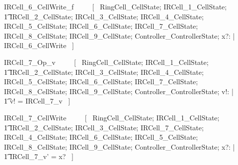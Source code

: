 \documentclass{article}
\begin{document}
\begin{zed}
IRCell\_6\_CellWrite\_f ~~~~ [~ 
    \Xi RingCell\_CellState; 
    \Xi IRCell\_1\_CellState; \\
    \t1 \Xi IRCell\_2\_CellState; 
    \Xi IRCell\_3\_CellState;
    \Xi IRCell\_4\_CellState; 
    \Xi IRCell\_5\_CellState; 
    \Xi IRCell\_6\_CellState; 
    \Xi IRCell\_7\_CellState; 
    \Xi IRCell\_8\_CellState; 
    \Xi IRCell\_9\_CellState; 
    \Xi Controller\_ControllerState; 
    x?: \nat | \\
    \lnot \pre IRCell\_6\_CellWrite ~] \\
\end{zed}
\begin{zed}
IRCell\_7\_Op\_v ~~~~ [~ 
    \Xi RingCell\_CellState; 
    \Xi IRCell\_1\_CellState; \\
    \t1 \Xi IRCell\_2\_CellState; 
    \Xi IRCell\_3\_CellState;
    \Xi IRCell\_4\_CellState; 
    \Xi IRCell\_5\_CellState; 
    \Xi IRCell\_6\_CellState; 
    \Xi IRCell\_7\_CellState; 
    \Xi IRCell\_8\_CellState; 
    \Xi IRCell\_9\_CellState; 
    \Xi Controller\_ControllerState; v!: \nat | \\
    \t1 v! = IRCell\_7\_v ~] \\
\end{zed}

\begin{zed}
IRCell\_7\_CellWrite ~~~~ [~ 
    \Xi RingCell\_CellState; 
    \Xi IRCell\_1\_CellState; \\
    \t1 \Xi IRCell\_2\_CellState; 
    \Xi IRCell\_3\_CellState; 
    \Delta IRCell\_7\_CellState;
    \Xi IRCell\_4\_CellState; 
    \Xi IRCell\_6\_CellState; 
    \Xi IRCell\_5\_CellState; 
    \Xi IRCell\_8\_CellState; 
    \Xi IRCell\_9\_CellState; 
    \Xi Controller\_ControllerState; 
    x?: \nat | \\
    \t1 IRCell\_7\_v' = x? ~] \\
\end{zed}
\end{document}

